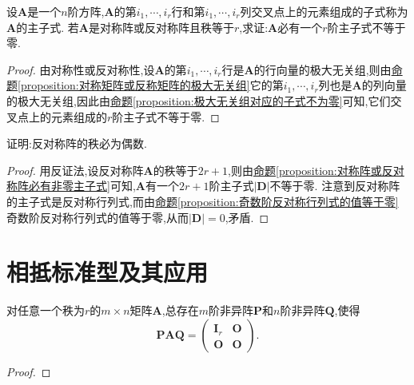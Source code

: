 \documentclass[lang=cn,newtx,10pt,scheme=chinese]{elegantbook}
\begin{document}
\begin{proposition}\label{proposition:对称阵或反对称阵必有非零主子式}
设\(\boldsymbol{A}\)是一个\(n\)阶方阵,\(\boldsymbol{A}\)的第\(i_1,\cdots,i_r\)行和第\(i_1,\cdots,i_r\)列交叉点上的元素组成的子式称为\(\boldsymbol{A}\)的主子式. 若\(\boldsymbol{A}\)是对称阵或反对称阵且秩等于\(r\),求证:\(\boldsymbol{A}\)必有一个\(r\)阶主子式不等于零.
\end{proposition}
\begin{proof}
    由对称性或反对称性,设\(\boldsymbol{A}\)的第\(i_1,\cdots,i_r\)行是\(\boldsymbol{A}\)的行向量的极大无关组,则由\hyperref[proposition:对称矩阵或反称矩阵的极大无关组]{命题\ref{proposition:对称矩阵或反称矩阵的极大无关组}}它的第\(i_1,\cdots,i_r\)列也是\(\boldsymbol{A}\)的列向量的极大无关组,因此由\hyperref[proposition:极大无关组对应的子式不为零]{命题\ref{proposition:极大无关组对应的子式不为零}}可知,它们交叉点上的元素组成的\(r\)阶主子式不等于零. 
\end{proof}

\begin{proposition}[反对称阵的秩必为偶数]\label{proposition:反对称阵的秩必为偶数}
证明:反对称阵的秩必为偶数.
\end{proposition}
\begin{proof}
    用反证法,设反对称阵\(\boldsymbol{A}\)的秩等于\(2r + 1\),则由\hyperref[proposition:对称阵或反对称阵必有非零主子式]{命题\ref{proposition:对称阵或反对称阵必有非零主子式}}可知,\(\boldsymbol{A}\)有一个\(2r + 1\)阶主子式\(|\boldsymbol{D}|\)不等于零. 注意到反对称阵的主子式是反对称行列式,而由\hyperref[proposition:奇数阶反对称行列式的值等于零]{命题\ref{proposition:奇数阶反对称行列式的值等于零}}奇数阶反对称行列式的值等于零,从而\(|\boldsymbol{D}| = 0\),矛盾.
\end{proof}









\section{相抵标准型及其应用}

\begin{theorem}[矩阵的相抵标准型]\label{theorem:矩阵的相抵标准型}
对任意一个秩为\(r\)的\(m\times n\)矩阵\(\boldsymbol{A}\),总存在\(m\)阶非异阵\(\boldsymbol{P}\)和\(n\)阶非异阵\(\boldsymbol{Q}\),使得
\[
\boldsymbol{P}\boldsymbol{A}\boldsymbol{Q}=\begin{pmatrix}
\boldsymbol{I}_r&\boldsymbol{O}\\
\boldsymbol{O}&\boldsymbol{O}
\end{pmatrix}.
\]
\end{theorem}
\begin{proof}
    
\end{proof}
\end{document}
